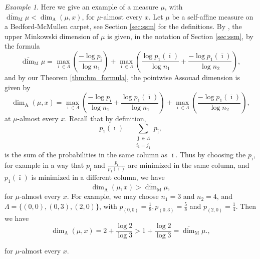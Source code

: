 \documentclass{PRM}
\newcommand{\updim}{\overline{\dim}}
\newcommand{\adim}{\dim_{\mathrm{A}}}
\theoremstyle{plain}
\theoremstyle{definition}
\theoremstyle{remark}
\newtheorem{example}[thm]{Example}
\begin{document}
\begin{example}
Here we give an example of a measure $\mu$, with $\updim_{\mathrm{M}}\mu<\adim(\mu,x)$, for $\mu$-almost every $x$. Let $\mu$ be a self-affine measure on a Bedford-McMullen carpet, see Section \ref{sec:ssm} for the definitions. By \cite[Theorem 8.6.2]{F}, the upper Minkowski dimension of $\mu$ is given, in the notation of Section \ref{sec:ssm}, by the formula
\begin{equation*}
    \updim_{\mathrm{M}}\mu=\max_{\bar{\imath}\in\Lambda}\left(\frac{-\log p_{\bar{\imath}}}{\log n_1}\right)+\max_{\bar{\imath}\in\Lambda}\left(\frac{\log p_1(\bar{\imath})}{\log n_1}+\frac{-\log p_1(\bar{\imath})}{\log n_2}\right),
\end{equation*}
and by our Theorem \ref{thm:bm_formula}, the pointwise Assouad dimension is given by
\begin{equation*}
    \adim(\mu,x)=\max_{\bar{\imath}\in\Lambda}\left(\frac{-\log p_{\bar{\imath}}}{\log n_1}+\frac{\log p_1(\bar{\imath})}{\log n_1}\right)+\max_{\bar{\imath}\in\Lambda}\left(\frac{-\log p_1(\bar{\imath})}{\log n_2}\right),
\end{equation*}
at $\mu$-almost every $x$. Recall that by definition,
\begin{equation*}
    p_1(\bar{\imath})=\sum_{\substack{\bar{\jmath}\in\Lambda \\i_1=j_1}}p_{\bar{\jmath}},
\end{equation*}
is the sum of the probabilities in the same column as $\bar{\imath}$. Thus by choosing the $p_{\bar{\imath}}$, for example in a way that $p_{\bar{\imath}}$ and $\frac{p_{\bar{\imath}}}{p_1(\bar{\imath})}$ are minimized in the same column, and $p_1(\bar{\imath})$ is minimized in a different column, we have
\begin{equation*}
    \adim(\mu,x)>\updim_{\mathrm{M}}\mu,
\end{equation*}
for $\mu$-almost every $x$. For example, we may choose $n_1=3$ and $n_2=4$, and $\Lambda=\{(0,0),(0,3),(2,0)\}$, with $p_{(0,0)}=\frac{1}{8},p_{(0,3)}=\frac{5}{8}$ and $p_{(2,0)}=\frac{1}{4}$. Then we have
\begin{equation*}
    \adim(\mu,x)=2+\frac{\log 2}{\log 3}> 1+\frac{\log 2}{\log 3}=\updim_{\mathrm{M}}\mu.,\end{equation*}
\end{example}
for $\mu$-almost every $x$.


            
\end{document}
